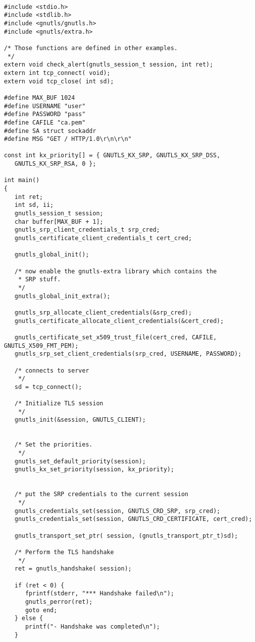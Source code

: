 \begin{verbatim}

#include <stdio.h>
#include <stdlib.h>
#include <gnutls/gnutls.h>
#include <gnutls/extra.h>

/* Those functions are defined in other examples.
 */
extern void check_alert(gnutls_session_t session, int ret);
extern int tcp_connect( void);
extern void tcp_close( int sd);

#define MAX_BUF 1024
#define USERNAME "user"
#define PASSWORD "pass"
#define CAFILE "ca.pem"
#define SA struct sockaddr
#define MSG "GET / HTTP/1.0\r\n\r\n"

const int kx_priority[] = { GNUTLS_KX_SRP, GNUTLS_KX_SRP_DSS, 
   GNUTLS_KX_SRP_RSA, 0 };

int main()
{
   int ret;
   int sd, ii;
   gnutls_session_t session;
   char buffer[MAX_BUF + 1];
   gnutls_srp_client_credentials_t srp_cred;
   gnutls_certificate_client_credentials_t cert_cred;

   gnutls_global_init();

   /* now enable the gnutls-extra library which contains the
    * SRP stuff. 
    */
   gnutls_global_init_extra();

   gnutls_srp_allocate_client_credentials(&srp_cred);
   gnutls_certificate_allocate_client_credentials(&cert_cred);

   gnutls_certificate_set_x509_trust_file(cert_cred, CAFILE, GNUTLS_X509_FMT_PEM);
   gnutls_srp_set_client_credentials(srp_cred, USERNAME, PASSWORD);

   /* connects to server 
    */
   sd = tcp_connect();

   /* Initialize TLS session 
    */
   gnutls_init(&session, GNUTLS_CLIENT);


   /* Set the priorities.
    */
   gnutls_set_default_priority(session);
   gnutls_kx_set_priority(session, kx_priority);
 

   /* put the SRP credentials to the current session
    */
   gnutls_credentials_set(session, GNUTLS_CRD_SRP, srp_cred);
   gnutls_credentials_set(session, GNUTLS_CRD_CERTIFICATE, cert_cred);

   gnutls_transport_set_ptr( session, (gnutls_transport_ptr_t)sd);

   /* Perform the TLS handshake
    */
   ret = gnutls_handshake( session);

   if (ret < 0) {
      fprintf(stderr, "*** Handshake failed\n");
      gnutls_perror(ret);
      goto end;
   } else {
      printf("- Handshake was completed\n");
   }


\end{verbatim}
